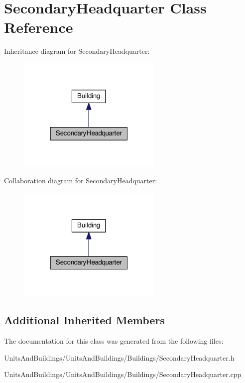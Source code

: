 \hypertarget{class_secondary_headquarter}{}\section{Secondary\+Headquarter Class Reference}
\label{class_secondary_headquarter}


Inheritance diagram for Secondary\+Headquarter\+:
\nopagebreak
\begin{figure}[H]
\begin{center}
\leavevmode
\includegraphics[width=196pt]{class_secondary_headquarter__inherit__graph}
\end{center}
\end{figure}


Collaboration diagram for Secondary\+Headquarter\+:
\nopagebreak
\begin{figure}[H]
\begin{center}
\leavevmode
\includegraphics[width=196pt]{class_secondary_headquarter__coll__graph}
\end{center}
\end{figure}
\subsection*{Additional Inherited Members}


The documentation for this class was generated from the following files\+:\begin{DoxyCompactItemize}
\item 
Units\+And\+Buildings/\+Units\+And\+Buildings/\+Buildings/Secondary\+Headquarter.\+h\item 
Units\+And\+Buildings/\+Units\+And\+Buildings/\+Buildings/Secondary\+Headquarter.\+cpp\end{DoxyCompactItemize}
